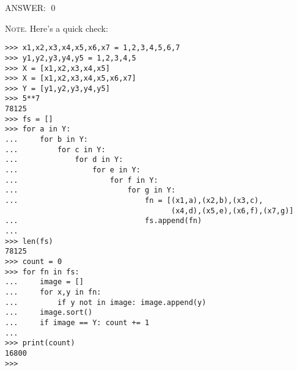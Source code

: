 ANSWER:
\qed



\vspace{1cm}
\textsc{Note.} 
Here's a quick check:
\begin{Verbatim}[frame=single,fontsize=\footnotesize]
>>> x1,x2,x3,x4,x5,x6,x7 = 1,2,3,4,5,6,7
>>> y1,y2,y3,y4,y5 = 1,2,3,4,5
>>> X = [x1,x2,x3,x4,x5]
>>> X = [x1,x2,x3,x4,x5,x6,x7]
>>> Y = [y1,y2,y3,y4,y5]
>>> 5**7
78125
>>> fs = []
>>> for a in Y:
...     for b in Y:
...         for c in Y:
...             for d in Y:
...                 for e in Y:
...                     for f in Y:
...                         for g in Y:
...                             fn = [(x1,a),(x2,b),(x3,c),
                                      (x4,d),(x5,e),(x6,f),(x7,g)]
...                             fs.append(fn)
... 
>>> len(fs)
78125
>>> count = 0
>>> for fn in fs:
...     image = []
...     for x,y in fn:
...         if y not in image: image.append(y)
...     image.sort()
...     if image == Y: count += 1
... 
>>> print(count)
16800
>>> 
\end{Verbatim}

